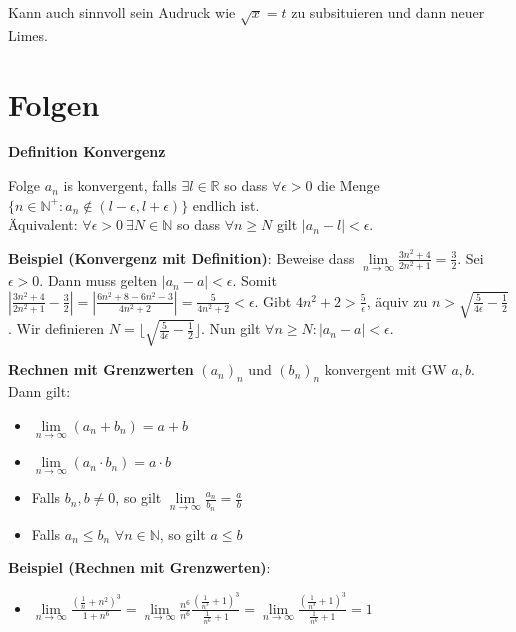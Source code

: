 \documentclass[25pt]{sciposter}
\newcommand{\limm}{\lim\limits_{n \to \infty}}
\newcommand{\N}{\mathbb{N}}
\newenvironment{method}[1]{\begin{mdframed}[backgroundcolor=blue!10,innertopmargin=15pt, innerbottommargin=15pt, nobreak=true]
		\textbf{#1 }
	}
	{ 
	\end{mdframed}
}
\newenvironment{important}{\begin{mdframed}[backgroundcolor=red!50,innertopmargin=15pt, innerbottommargin=15pt, nobreak=true]
		\Large
	}
	{ 
	\end{mdframed}
}
\begin{document}
\begin{multicols}{3}
\begin{important}
Kann auch sinnvoll sein Audruck wie $\sqrt{x} = t$ zu subsituieren und dann neuer Limes.
\end{important}




\section*{Folgen}

\begin{method}{Definition Konvergenz}
Folge $a_n$ is konvergent, falls $\exists l \in \mathbb{R}$ so dass $\forall \epsilon > 0$ die Menge $\{n \in \mathbb{N}^+: a_n \not \in (l-\epsilon, l + \epsilon)\}$ endlich ist. \\
Äquivalent: $\forall \epsilon > 0 \ \exists N \in \N $ so dass $ \forall n \geq N$ gilt $|a_n - l|< \epsilon$.
\end{method}

\textbf{Beispiel (Konvergenz mit Definition)}: 
Beweise dass $\limm \frac{3n^2 + 4}{2n^2 + 1} = \frac{3}{2}$. Sei $\epsilon > 0$. Dann muss gelten $|a_n - a | < \epsilon$. Somit $\left| \frac{3n^2 + 4}{2n^2 + 1} -  \frac{3}{2}\right| = \left| \frac{6n^2 + 8 - 6n^2 -3}{4n^2 + 2} \right| = \frac{5}{4n^2 + 2} < \epsilon$. Gibt $4n^2 + 2 > \frac{5}{\epsilon}$, äquiv zu $n > \sqrt{\frac{5}{4 \epsilon} - \frac{1}{2}}$. Wir definieren $N = \lfloor \sqrt{\frac{5}{4 \epsilon} - \frac{1}{2}} \rfloor$. Nun gilt $\forall n \geq N : |a_n - a | < \epsilon$.




\begin{method}{Rechnen mit Grenzwerten} $(a_n)_n$ und $(b_n)_n$ konvergent mit GW $a,b$. Dann gilt:
	\begin{itemize}
		\item $\lim \limits_{n \to \infty} (a_n + b_n) = a + b$	
		\item $\lim \limits_{n \to \infty} (a_n \cdot b_n) = a \cdot b$
		\item  Falls $b_n, b \not = 0$, so gilt $\lim \limits_{n \to \infty} \frac{a_n}{b_n} = \frac{a}{b}$
		\item Falls $a_n \leq b_n$ $\forall n \in \mathbb{N}$, so gilt $a \leq b$
	\end{itemize}
\end{method}

\textbf{Beispiel (Rechnen mit Grenzwerten)}: 
\begin{itemize}
	\item $\limm  \frac{(\frac{1}{n} + n^2 )^3}{1 + n^6} = \limm \frac{n^6}{n^6} \frac{(\frac{1}{n^3} + 1 )^3}{\frac{1}{n^6} + 1} = \limm \frac{(\frac{1}{n^3} + 1 )^3}{\frac{1}{n^6} + 1} = 1$
	

\end{itemize}
\end{multicols}
\end{document}
